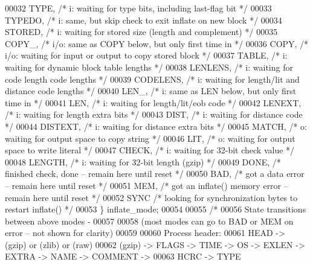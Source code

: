 \begin{DoxyCode}
00032         TYPE,       \textcolor{comment}{/* i: waiting for type bits, including last-flag bit */}
00033         TYPEDO,     \textcolor{comment}{/* i: same, but skip check to exit inflate on new block */}
00034         STORED,     \textcolor{comment}{/* i: waiting for stored size (length and complement) */}
00035         COPY\_,      \textcolor{comment}{/* i/o: same as COPY below, but only first time in */}
00036         COPY,       \textcolor{comment}{/* i/o: waiting for input or output to copy stored block */}
00037         TABLE,      \textcolor{comment}{/* i: waiting for dynamic block table lengths */}
00038         LENLENS,    \textcolor{comment}{/* i: waiting for code length code lengths */}
00039         CODELENS,   \textcolor{comment}{/* i: waiting for length/lit and distance code lengths */}
00040             LEN\_,       \textcolor{comment}{/* i: same as LEN below, but only first time in */}
00041             LEN,        \textcolor{comment}{/* i: waiting for length/lit/eob code */}
00042             LENEXT,     \textcolor{comment}{/* i: waiting for length extra bits */}
00043             DIST,       \textcolor{comment}{/* i: waiting for distance code */}
00044             DISTEXT,    \textcolor{comment}{/* i: waiting for distance extra bits */}
00045             MATCH,      \textcolor{comment}{/* o: waiting for output space to copy string */}
00046             LIT,        \textcolor{comment}{/* o: waiting for output space to write literal */}
00047     CHECK,      \textcolor{comment}{/* i: waiting for 32-bit check value */}
00048     LENGTH,     \textcolor{comment}{/* i: waiting for 32-bit length (gzip) */}
00049     DONE,       \textcolor{comment}{/* finished check, done -- remain here until reset */}
00050     BAD,        \textcolor{comment}{/* got a data error -- remain here until reset */}
00051     MEM,        \textcolor{comment}{/* got an inflate() memory error -- remain here until reset */}
00052     SYNC        \textcolor{comment}{/* looking for synchronization bytes to restart inflate() */}
00053 \} inflate\_mode;
00054 
00055 \textcolor{comment}{/*}
00056 \textcolor{comment}{    State transitions between above modes -}
00057 \textcolor{comment}{}
00058 \textcolor{comment}{    (most modes can go to BAD or MEM on error -- not shown for clarity)}
00059 \textcolor{comment}{}
00060 \textcolor{comment}{    Process header:}
00061 \textcolor{comment}{        HEAD -> (gzip) or (zlib) or (raw)}
00062 \textcolor{comment}{        (gzip) -> FLAGS -> TIME -> OS -> EXLEN -> EXTRA -> NAME -> COMMENT ->}
00063 \textcolor{comment}{                  HCRC -> TYPE}

\end{DoxyCode}
